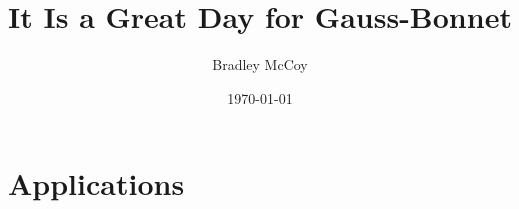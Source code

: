 \documentclass[12pt]{article}
\title{It Is a Great Day for Gauss-Bonnet}
\author{Bradley McCoy}
\date{\today}
\begin{document}
\maketitle \tableofcontents 
\pagebreak












\section{Applications}\label{sec:applications}



%





{
\small

%

}
\end{document}
